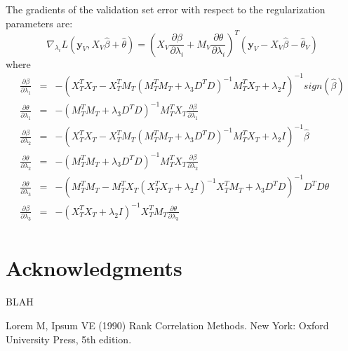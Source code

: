 \documentclass[10pt,letterpaper]{article}
\begin{document}
The gradients of the validation set error with respect to the regularization parameters are:
\begin{equation}
\nabla_{\lambda_i} L(\boldsymbol y_V, X_V \hat \beta + \hat \theta) = (X_V \frac{\partial \beta}{\partial \lambda_i} + M_V \frac{\partial \theta}{\partial \lambda_i})^T(\boldsymbol y_V - X_V \hat \beta - \hat \theta_V)
\end{equation}
where
\begin{equation}
\begin{array}{lcl}
\frac{\partial \beta}{\partial \lambda_1} &=& -(X_T^T X_T - X_T^T M_T(M_T^T M_T + \lambda_3 D^TD)^{-1} M_T^T X_T + \lambda_2 I)^{-1} sign(\hat \beta) \\
\frac{\partial \theta}{\partial \lambda_1} &=& -(M_T^T M_T + \lambda_3 D^T D)^{-1}  M_T^T X_T \frac{\partial \beta}{\partial \lambda_1}
\\
\frac{\partial \beta}{\partial \lambda_2} &=& -(X_T^T X_T - X_T^T M_T(M_T^T M_T + \lambda_3 D^TD)^{-1} M_T^T X_T + \lambda_2 I)^{-1} \hat \beta \\
\frac{\partial \theta}{\partial \lambda_2} &=& -(M_T^T M_T + \lambda_3 D^T D)^{-1}  M_T^T X_T \frac{\partial \beta}{\partial \lambda_2}
\\
\frac{\partial \theta}{\partial \lambda_3} &=& -(M_T^T M_T - M_T^T X_T (X_T^TX_T + \lambda_2 I)^{-1} X_T^T M_T + \lambda_3 D^TD)^{-1} D^TD \theta
\\
\frac{\partial \beta}{\partial \lambda_3} &=& - (X_T^TX_T + \lambda_2 I)^{-1} X_T^T M_T \frac{\partial \theta}{\partial \lambda_3} \\
\end{array}
\end{equation}

\section*{Acknowledgments}
BLAH


%
%
% 
\begin{thebibliography}{10}
Lorem M, Ipsum VE (1990) Rank Correlation Methods. New York: Oxford University Press, 5th edition.

\end{thebibliography}
\end{document}
